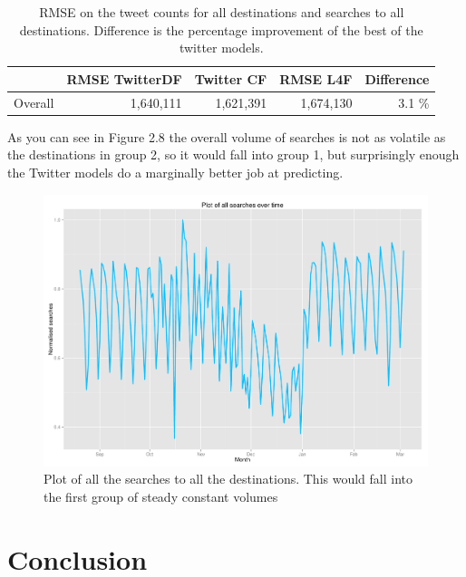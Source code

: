 \documentclass[minf,frontabs,twoside,singlespacing,parskip]{infthesis}
\begin{document}
\begin{table}[h!]
\begin{center}
\begin{tabular}{ l | r | r | r | r}
 & RMSE TwitterDF & Twitter CF & RMSE L4F & Difference \\
\hline
Overall & 1,640,111 & 1,621,391  & 1,674,130 & 3.1 \% \\
\end{tabular}
\end{center}
\caption{RMSE on the tweet counts for all destinations and searches to all destinations. Difference is the percentage improvement of the best of the twitter models.}
\end{table}

As you can see in Figure 2.8 the overall volume of searches is not as volatile as the destinations in group 2, so it would fall into group 1, but surprisingly enough the Twitter models do a marginally better job at predicting.

\begin{figure}[h]
\begin{center}
\includegraphics[scale=0.4]{overall}
\end{center}
\caption{Plot of all the searches to all the destinations. This would fall into the first group of steady constant volumes}
\end{figure}

%
\newpage
\section{Conclusion}
\end{document}
